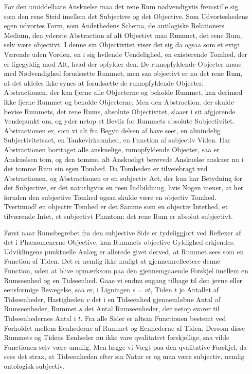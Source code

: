 \documentclass[12pt]{book}
\newcommand{\apage}[1]{\marginnote{\footnotesize\textit{[#1]}}}
\begin{document}
For den umiddelbare Anskuelse maa det rene Rum nødvendigviis fremstille sig som den rene
Strid imellem det Subjective og det Objective. Som Udvorteshedens egen udvortes Form, som
Andethedens Schema, de antilogiske Relationers Medium, den yderste Abstraction af alt
Objectivt maa Rummet, det rene Rum, selv være objectivt. I denne sin Objectivitet viser
det sig da ogsaa som et evigt Værende uden Vorden, en i sig hvilende Uendelighed, en
existerende Tomhed, der er ligegyldig mod Alt, hvad der opfylder den. De rumopfyldende
Objecter maae med Nødvendighed forudsætte Rummet, men saa objectivt er nu det rene Rum,
at det aldeles ikke synes at forudsætte de rumopfyldende Objecter. Abstractionen, der kan
fjerne alle Objecterne og beholde Rummet, kan derimod ikke fjerne Rummet og beholde
Objecterne. Men den Abstraction, der skulde bevise Rummets, det rene Rums, absolute
Objectivitet, slaaer i sit afgjørende Vendepunkt om, og yder netop et Beviis for Rummets
absolute Subjectivitet. Abstractionen er, som vi alt fra Begyn\-%
delsen \apage{346} af have seet, en almindelig Subjectivitetsact, en Tankevirksomhed, en Function af
subjectiv Viden. Har Abstractionen borttaget alle anskuelige, rumopfyldende Objecter, saa
er Anskuelsen tom, og den tomme, alt Anskueligt berøvede Anskuelse anskuer nu i det tomme
Rum sin egen Tomhed. Da Tomheden er tilveiebragt ved Abstractionen, og Abstractionen er
en subjectiv Act, der kun har Betydning for det Subjective, er det naturligviis en reen
Indbildning, hvis Nogen mener, at her foruden den subjective Tomhed ogsaa skulde være en
objectiv Tomhed. Tvertimod! en objectiv Tomhed er det Samme som en objectiv Intethed, et
tilværende Intet, et subjectivt Phantom: det rene Rum er absolut subjectivt.

Først naar Rumsbegrebet fra den subjective Side er tydeliggjort ved Reflexer af det i
Phænomenerne Objective, kan Rummets objective Gyldighed erkjendes. Udviklingens
punktuelle Anlæg er allerede givet derved, at Rummet sees som en Function af Tiden. Det er
nemlig ikke muligt at gjennemreflectere denne Function, uden at blive opmærksom paa den
gjennemgaaende Forskjel imellem en Rumseenhed og en Tidseenhed. Gaae vi endnu engang
tilbage til den jevne eller eensformige Bevægelse, saa er, i Ligningen $s = vt$, Tiden
$t$ jo Antallet af Tidseenheder, Hastigheden $v$ det i en Tidseenhed gjennemløbne Antal af
Rumseenheder, Rummet $s$ det Antal Rumseenheder, der netop svarer til Tidseenhedernes
Antal i $t$. Fra alle Sider er altsaa Functionen bestemt ved Forholdet mellem Eenhederne
af Rummet og Eenhederne af Tiden. Dersom disse Rummets og Tidens Eenheder nu ikke vare
qvalitativt forskjellige, saa vilde Functionen selv være umulig. Men lægge vi Vægt paa den
qvalitative Forskjel, da sees det strax, at Tidseenheden efter sin Natur er og maa være
subjectiv, nemlig ontologisk subjectiv.
\end{document}
